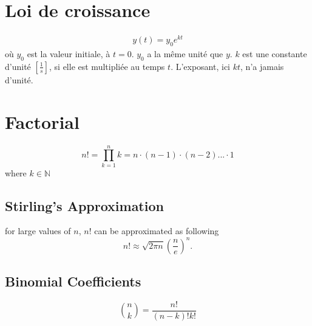 \section{Loi de croissance}
\begin{eqnarray}
	y(t)=y_0e^{kt}
\end{eqnarray}
où $y_0$ est la valeur initiale, à $t=0$. $y_0$ a la même unité que $y$.
$k$ est une constante d'unité $[\frac{1}{s}]$, si elle est multipliée au temps $t$. L'exposant, ici $kt$, n'a jamais d'unité.

\section{Factorial}
\begin{equation}
	n! = \prod_{k=1}^n k  = n\cdot(n-1)\cdot(n-2)...\cdot1
\end{equation}
where $k\in\mathbb N$

\subsection{Stirling's Approximation}
for large values of $n$, $n!$ can be approximated as following
\begin{equation}
	n! \approx \sqrt{2\pi n}\left(\frac{n}{e}\right)^n.
\end{equation}

\subsection{Binomial Coefficients}
\begin{equation}
	\binom nk = \frac{n!}{(n-k)!k!}
\end{equation}
